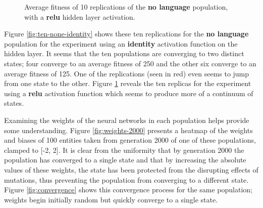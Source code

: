 \documentclass[12pt,a4paper,twoside,openright]{report}
\begin{document}
\begin{figure}[t]
\begin{minipage}{0.49\textwidth}
          \caption{Average fitness of 10 replications of the {\bf no language} population, with a {\bf relu} hidden layer activation.}
          \label{fig:ten-none-relu}
   \end{minipage}
\end{figure}

Figure \ref{fig:ten-none-identity} shows these ten replications for the {\bf no language} population for the experiment using an {\bf identity} activation function on the hidden layer. It seems that the ten populations are converging to two distinct states; four converge to an average fitness of 250 and the other six converge to an average fitness of 125. One of the replications (seen in red) even seems to jump from one state to the other. Figure \ref{fig:ten-none-relu} reveals the ten replicas for the experiment using a {\bf relu} activation function which seems to produce more of a continuum of states.

Examining the weights of the neural networks in each population helps provide some understanding. Figure \ref{fig:weights-2000} presents a heatmap of the weights and biases of 100 entities taken from generation 2000 of one of these populations, clamped to [-2, 2]. It is clear from the uniformity that by generation 2000 the population has converged to a single state and that by increasing the absolute values of these weights, the state has been protected from the disrupting effects of mutations, thus preventing the population from converging to a different state. Figure \ref{fig:convergence} shows this convergence process for the same population; weights begin initially random but quickly converge to a single state.
\end{document}

